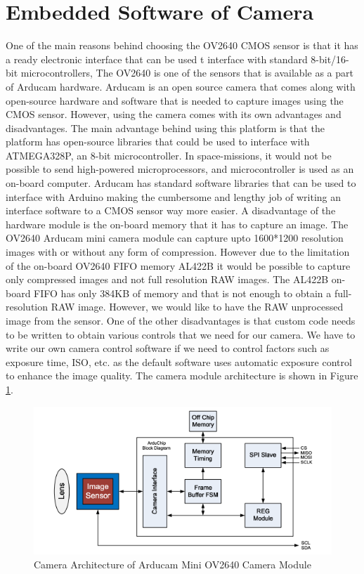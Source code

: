 \section{Embedded Software of Camera}
One of the main reasons behind choosing the OV2640 CMOS sensor is that it has a ready electronic interface that can be used t interface with standard 8-bit/16-bit microcontrollers,  The OV2640 is one of the sensors that is available as a part of Arducam hardware. Arducam is an open source camera that comes along with open-source hardware and software that is needed to capture images using the CMOS sensor. However, using the camera comes with its own advantages and disadvantages. The main advantage behind using this platform is that the platform has open-source libraries that could be used to interface with ATMEGA328P, an 8-bit microcontroller. In space-missions, it would not be possible to send high-powered microprocessors, and microcontroller is used as an on-board computer. Arducam has standard software libraries that can be used to interface with Arduino making the cumbersome and lengthy job of writing an interface software to a CMOS sensor way more easier.  A disadvantage of the hardware module is the on-board memory that it has to capture an image. The OV2640 Arducam mini camera module can capture upto 1600*1200 resolution images with or without any form of compression. However due to the limitation of the on-board OV2640 FIFO memory AL422B it would be possible to capture only compressed images and not full resolution RAW images. The AL422B on-board FIFO has only 384KB of memory and that is not enough to obtain a full-resolution RAW image. However, we would like to have the RAW unprocessed image from the sensor. One of the other disadvantages is that custom code needs to be written to obtain various controls that we need for our camera. We have to write our own camera control software if we need to control factors such as exposure time, ISO, etc. as the default software uses automatic exposure control to enhance the image quality. The camera module architecture is shown in Figure \ref{fig:arducam_arch}.

 \begin{figure}[!htbp]
\centering
\includegraphics[scale=0.75]{pics/arducam_architecture}
\caption{Camera Architecture of Arducam Mini OV2640 Camera Module}
\label{fig:arducam_arch}
\end{figure}

